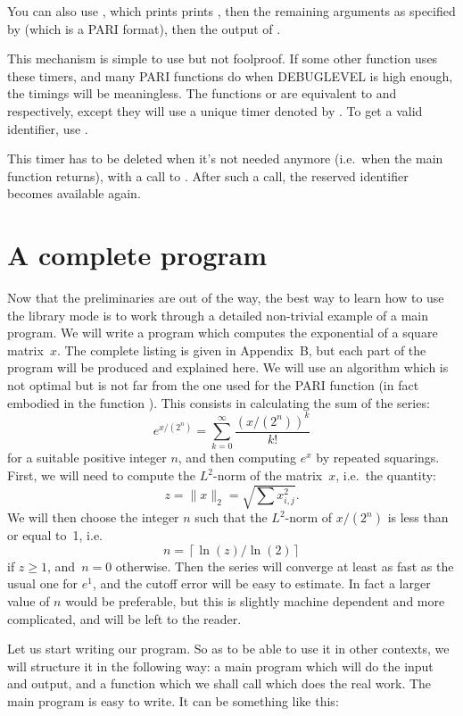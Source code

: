 You can also use , which prints
prints , then the remaining arguments as specified by
 (which is a PARI format), then the output of .

This mechanism is simple to use but not foolproof. If some other function
uses these timers, and many PARI functions do when DEBUGLEVEL is high enough,
the timings will be meaningless. The functions  or  are equivalent to
 and  respectively, except they will use a unique
timer denoted by . To get a valid identifier, use
.

This timer has to be deleted when it's not needed anymore
(i.e.~when the main function returns), with a call to .
After such a call, the reserved identifier becomes available again.

\section{A complete program}
\label{se:prog}

\noindent
Now that the preliminaries are out of the way, the best way to learn how to
use the library mode is to work through a detailed non-trivial example of a
main program. We will write a program which computes the exponential of a
square matrix~$x$.  The complete listing is given in Appendix~B, but each
part of the program will be produced and explained here. We will use an
algorithm which is not optimal but is not far from the one used for the PARI
function  (in fact embodied in the function ). This
consists in calculating the sum of the series:
$$e^{x/(2^n)}=\sum_{k=0}^\infty \dfrac{(x/(2^n))^k}{k!}$$
for a suitable positive integer $n$, and then computing $e^x$ by repeated
squarings.  First, we will need to compute the $L^2$-norm of the matrix~$x$,
i.e.~the quantity:
$$z=\|x\|_2=\sqrt{\sum x_{i,j}^2}.$$
We will then choose the integer $n$ such that the $L^2$-norm of $x/(2^n)$ is
less than or equal to~1, i.e.
$$ n = \left\lceil{\ln(z)}\big/{\ln(2)}\right\rceil $$
if $z\ge1$, and~$n=0$ otherwise. Then the series will converge at least as
fast as the usual one for $e^1$, and the cutoff error will be easy to
estimate. In fact a larger value of $n$ would be preferable, but this is
slightly machine dependent and more complicated, and will be left to the
reader.

Let us start writing our program. So as to be able to use it in other
contexts, we will structure it in the following way: a main program which
will do the input and output, and a function which we shall call 
which does the real work. The main program is easy to write. It can be
something like this:

